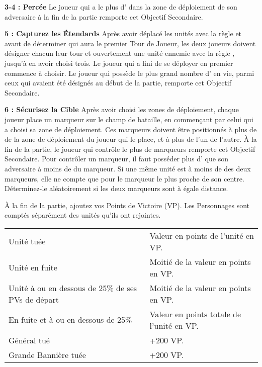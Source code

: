 {\textbf{3-4 : Percée}\newline
Le joueur qui a le plus d'\scoringunits{} dans la zone de déploiement de son adversaire à la fin de la partie remporte cet Objectif Secondaire. 

\textbf{5 : Capturez les Étendards}\newline
Après avoir déplacé les unités avec la règle \vanguard{} et avant de déterminer qui aura le premier Tour de Joueur, les deux joueurs doivent désigner chacun leur tour et ouvertement une unité ennemie avec la règle \scoring{}, jusqu'à en avoir choisi trois. Le joueur qui a fini de se déployer en premier commence à choisir. Le joueur qui possède le plus grand nombre d'\scoringunits{} en vie, parmi ceux qui avaient été désignés au début de la partie, remporte cet Objectif Secondaire.

\textbf{6 : Sécurisez la Cible}\newline
Après avoir choisi les zones de déploiement, chaque joueur place un marqueur sur le champ de bataille, en commençant par celui qui a choisi sa zone de déploiement. Ces marqueurs doivent être positionnés à plus de  de la zone de déploiement du joueur qui le place, et à plus de  l'un de l'autre. À la fin de la partie, le joueur qui contrôle le plus de marqueurs remporte cet Objectif Secondaire. Pour contrôler un marqueur, il faut posséder plus d'\scoringunits{} que son adversaire à moins de  du marqueur. Si une même unité est à moins de  des deux marqueurs, elle ne compte que pour le marqueur le plus proche de son centre. Déterminez-le aléatoirement si les deux marqueurs sont à égale distance.

\vspace*{-20pt}

\begin{minipage}[c]{0.48\textwidth}
À la fin de la partie, ajoutez vos Points de Victoire (VP). Les Personnages sont comptés séparément des unités qu'ils ont rejointes.

\vspace*{5pt}
\begin{center}\begin{tabular}{>{\raggedleft}p{}p{}}
\hline
Unité tuée & Valeur en points de l'unité en VP. \tabularnewline
Unité en fuite & Moitié de la valeur en points en VP. \tabularnewline
Unité à ou en dessous de 25\% de ses PVs de départ & Moitié de la valeur en points en VP. \tabularnewline
En fuite et à ou en dessous de 25\% & Valeur en points totale de l'unité en VP. \tabularnewline
Général tué & +200 VP. \tabularnewline
Grande Bannière tuée & +200 VP. \tabularnewline
\hline
\end{tabular}\end{center}


\end{minipage}}
